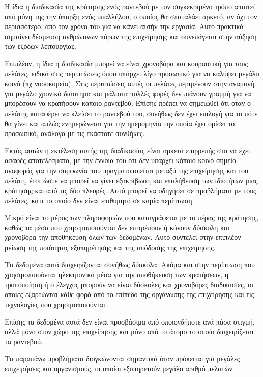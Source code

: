 Η  ίδια η διαδικασία της κράτησης ενός ραντεβού με τον συγκεκριμένο τρόπο απαιτεί από μόνη της την ύπαρξη ενός υπαλλήλου, ο οποίος θα σπαταλάει αρκετό, αν όχι τον περισσότερο, από τον χρόνο του για να κάνει αυτήν την εργασία. Αυτό πρακτικά σημαίνει δέσμευση ανθρώπινων πόρων της επιχείρησης και συνεπάγεται στην αύξηση των εξόδων λειτουργίας. 

Επιπλέον, η ίδια η διαδικασία μπορεί να είναι χρονοβόρα και κουραστική για τους πελάτες, ειδικά στις περιπτώσεις όπου υπάρχει λίγο προσωπικό για να καλύψει μεγάλο κοινό (πχ νοσοκομεία). Στις περιπτώσεις αυτές οι πελάτες περιμένουν στην αναμονή για μεγάλο χρονικό διάστημα και μάλιστα πολλές φορές δεν πιάνουν γραμμή για να μπορέσουν να κρατήσουν κάποιο ραντεβού. Επίσης πρέπει να σημειωθεί ότι όταν ο πελάτης καταφέρει να κλείσει το ραντεβού του, συνήθως δεν έχει επιλογή για το πότε θα γίνει και απλώς ενημερώνεται για την ημερομηνία την οποία έχει ορίσει το προσωπικό, ανάλογα με τις εκάστοτε συνθήκες.  

Εκτός αυτών η εκτέλεση αυτής της διαδικασίας είναι αρκετά επιρρεπής στο να έχει ασαφές αποτελέσματα, με την έννοια του ότι δεν υπάρχει κάποιο κοινό σημείο αναφοράς για την συμφωνία που πραγματοποιείται μεταξύ της επιχείρησης και του πελάτη, έτσι ώστε να μπορεί να γίνει εξακρίβωση και επαλήθευση των ιδιοτήτων μιας κράτησης και από τις δύο πλευρές. Αυτό μπορεί να οδηγήσει σε προβλήματα με τους πελάτες, κάτι το οποίο δεν είναι επιθυμητό σε καμία περίπτωση.

Μικρό είναι το μέρος των πληροφοριών που καταγράφεται με το πέρας της κράτησης, καθώς τα μέσα που χρησιμοποιούνται δεν επιτρέπουν ή κάνουν δύσκολη και χρονοβόρα την αποθήκευση όλων των δεδομένων. Αυτό συντελεί στην επιπλέον μείωση της ποιότητας εξυπηρέτησης και της απόδοσης της επιχείρησης.

Τα δεδομένα αυτά διαχειρίζονται συνήθως δύσκολα. Ακόμα και στην περίπτωση που χρησιμοποιούνται ηλεκτρονικά μέσα για την αποθήκευση των κρατήσεων, η τροποποίηση ή ο έλεγχος μπορούν να είναι δύσκολες και χρονοβόρες διαδικασίες, οι οποίες εξαρτώνται κάθε φορά από το επίπεδο της οργάνωσης της επιχείρησης και τις τεχνολογίες που χρησιμοποιούνται. 

Επίσης τα δεδομένα αυτά δεν είναι προσβάσιμα από οποιονδήποτε ανά πάσα στιγμή, αλλά μόνο στον χώρο της επιχείρησης και μόνο από το άτομο το οποίο διαχειρίζεται τα ραντεβού. 

Τα παραπάνω προβλήματα διογκώνονται σημαντικά όταν πρόκειται για μεγάλες επιχειρήσεις και οργανισμούς, οι οποίοι εξυπηρετούν μεγάλο αριθμό πελατών.

